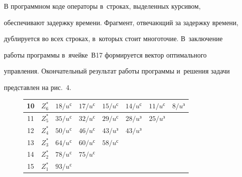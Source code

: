  


  В программном коде операторы в~строках, выделенных курсивом, 


обеспечивают задержку времени. Фрагмент, отвечающий за задержку времени, 


дублируется во всех строках, в~которых стоит многоточие. В~заключение 


работы программы в~ячейке~В17 формируется вектор оптимального 


управ\-ле\-ния. Окончательный результат работы программы и~решения задачи 


пред\-став\-лен на рис.~4.


  


  \begin{figure}[h] %


  {\small \begin{center}


  \tabcolsep=5pt


  \begin{tabular}{|c|c|c|c|c|c|c|c|}


  \hline


\cellcolor[gray]{.9}10&$Z_6^*$&$18/u^{\mathrm{с}}$&$17/u^{\mathrm{с}}$&


\cellcolor[gray]{.9}$15/u^{\mathrm{с}}$&$14/u^{\mathrm{с}}$&


$11/u^{\mathrm{с}}$&$8/u^{\mathrm{з}}$\\


\hline


 \cellcolor[gray]{.9}11&$Z^*_5$&$35/u^{\mathrm{с}}$&\cellcolor[gray]{.9}$32/u^{\mathrm{с}}$&


$29/u^{\mathrm{с}}$&$28/u^{\mathrm{з}}$ &$25/u^{\mathrm{з}}$&\\


\cellcolor[gray]{.9}12&$Z^*_4$&$50/u^{\mathrm{с}}$&$46/u^{\mathrm{с}}$&$43/u^{\mathrm{з}}$&


\cellcolor[gray]{.9}$43/ u^{\mathrm{з}}$& &\\


\cellcolor[gray]{.9}13&$Z^*_3$&$64/u^{\mathrm{с}}$&$60/u^{\mathrm{с}}$&\cellcolor[gray]{.9}$58/u{^\mathrm{с}}$& & &\\


\cellcolor[gray]{.9}14&$Z^*_2$&$78/u^{\mathrm{с}}$&\cellcolor[gray]{.9}$75/u^{\mathrm{с}}$& & & &\\


\cellcolor[gray]{.9}15&$Z_1^*$&\cellcolor[gray]{.9}$93/u{^\mathrm{с}}$& & & & &\\



\end{tabular}
\end{center}}
\end{figure}
